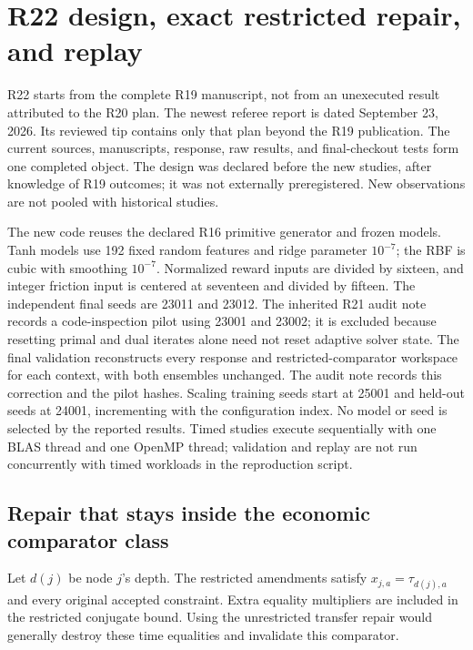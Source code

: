 \section{R22 design, exact restricted repair, and replay}\label{ec:r22-details}
R22 starts from the complete R19 manuscript, not from an unexecuted result attributed to the R20 plan. The newest referee report is dated September 23, 2026. Its reviewed tip contains only that plan beyond the R19 publication. The current sources, manuscripts, response, raw results, and final-checkout tests form one completed object. The design was declared before the new studies, after knowledge of R19 outcomes; it was not externally preregistered. New observations are not pooled with historical studies.

The new code reuses the declared R16 primitive generator and frozen models. Tanh models use 192 fixed random features and ridge parameter $10^{-7}$; the RBF is cubic with smoothing $10^{-7}$. Normalized reward inputs are divided by sixteen, and integer friction input is centered at seventeen and divided by fifteen. The independent final seeds are 23011 and 23012. The inherited R21 audit note records a code-inspection pilot using 23001 and 23002; it is excluded because resetting primal and dual iterates alone need not reset adaptive solver state. The final validation reconstructs every response and restricted-comparator workspace for each context, with both ensembles unchanged. The audit note records this correction and the pilot hashes. Scaling training seeds start at 25001 and held-out seeds at 24001, incrementing with the configuration index. No model or seed is selected by the reported results. Timed studies execute sequentially with one BLAS thread and one OpenMP thread; validation and replay are not run concurrently with timed workloads in the reproduction script.

\subsection{Repair that stays inside the economic comparator class}
Let $d(j)$ be node $j$'s depth. The restricted amendments satisfy $x_{j,a}=\tau_{d(j),a}$ and every original accepted constraint. Extra equality multipliers are included in the restricted conjugate bound. Using the unrestricted transfer repair would generally destroy these time equalities and invalidate this comparator.

